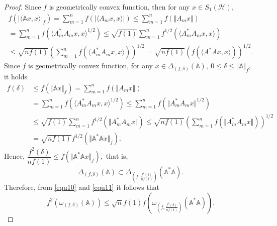 \documentclass[12pt]{article}
\begin{document}
\begin{proof}
Since $ f $ is geometrically convex function, then for any $x\in S_{1}(\mathcal{H})$,
\begin{multline}
\label{equ10}
f\left( \vert\langle \mathbb{A} x,x\rangle \vert_{f} \right)
=
\sum\limits_{m=1}^n
f\left( \vert \langle A_m x,x\rangle \vert \right) \leq
\sum\limits_{m=1}^n
f\left( \Vert A_m x\Vert \right)  \\
=
\sum\limits_{m=1}^n
f\left( \langle A_m^*A_m x,x\rangle^{1/2} \right) \leq \sqrt{f(1)}
\sum\limits_{m=1}^n
 f^{1/2}\left( \langle A_m^*A_m x,x\rangle\right)  \\
\leq
\sqrt{nf(1)}\left( \sum\limits_{m=1}^n
f\left(  \langle A_m^*A_m x,x\rangle\right)  \right) ^{1/2} =
\sqrt{nf(1)}\left(
f\left(  \langle A^{*}A x,x\rangle\right)  \right) ^{1/2}.
\end{multline}
Since $ f $ is geometrically convex function, for any $ x \in \Delta_{(f,\delta)}(\mathbb{A}), \ 0 \leq \delta \leq \Vert \mathbb{A} \Vert_f, $ it holds
\begin{align*}
f(\delta)
&\leq f(\Vert\mathbb{A} x\Vert_f) = \sum\limits_{m=1}^n f(\Vert A_m x\Vert) \\
&= \sum\limits_{m=1}^n f\left( \langle A_m^* A_m x, x\rangle^{1/2} \right) \leq \sum\limits_{m=1}^n f\left( \Vert A_m^* A_m x\Vert^{1/2} \right)  \\
&\leq \sqrt{f(1)}\sum\limits_{m=1}^n  f^{1/2} \left( \Vert A_m^* A_m x\Vert\right) \leq \sqrt{nf(1)}\left( \sum\limits_{m=1}^n  f \left( \Vert A_m^* A_m x\Vert\right)  \right)^{1/2}  \\
&= \sqrt{n f(1)}f^{1/2}(\Vert \mathbb{A}^* \mathbb{A} x\Vert_f) .
\end{align*}
Hence,
\(
\dfrac{f^2(\delta)}{n f(1)} \leq f(\Vert \mathbb{A}^* \mathbb{A} x\Vert_f),
\)
that is,
\begin{equation}
\label{equ11}
\Delta_{(f,\delta)}(\mathbb{A})
\subset
\Delta_{\left( f,\frac{f^2(\delta)}{n f(1)}\right) }(\mathbb{A}^*\mathbb{A}).
\end{equation}
Therefore, from \eqref{equ10} and \eqref{equ11} it follows that
\[
f^{2}\left( \omega_{(f,\delta)}(\mathbb{A} )\right)
\leq
\sqrt{n}f(1) f\left(
\omega_{\left( f, \frac{f^{2}(\delta )}{nf(1)} \right) }(\mathbb{A}^{*}\mathbb{A}) \right) . \tag*{\qedhere}
\]
\end{proof}
\end{document}
